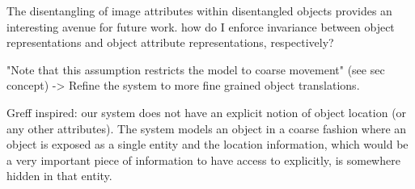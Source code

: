 \documentclass[12pt,a4paper]{article}
\begin{document}
\par The disentangling of image attributes within disentangled objects provides an interesting avenue for future work. how do I enforce invariance between object representations and object attribute representations, respectively?

\par "Note that this assumption restricts the model to coarse movement" (see sec concept) -> Refine the system to more fine grained object translations.

\par Greff inspired: our system does not have an explicit notion of object location (or any other attributes). The system models an object in a coarse fashion where an object is exposed as a single entity and the location information, which would be a very important piece of information to have access to explicitly, is somewhere hidden in that entity.


\printbibliography
\end{document}
